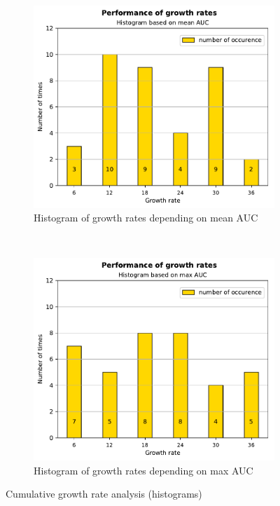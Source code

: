 \begin{figure}
  \centering
  \begin{subfigure}[b]{0.4\textwidth}
    \includegraphics[width=\textwidth]{images/densenet/siamese/densenet_siamese_gr_mean_bar}
    \caption{Histogram of growth rates depending on mean AUC}
    \label{fig:mean_auc_histogram}
  \end{subfigure}
  ~ %
  \begin{subfigure}[b]{0.4\textwidth}
    \includegraphics[width=\textwidth]{images/densenet/siamese/densenet_siamese_gr_max_bar}
    \caption{Histogram of growth rates depending on max AUC}
    \label{fig:max_auc_histogram}
  \end{subfigure}  
  \caption[Cumulative growth rate analysis (histograms)]{Cumulative growth rate analysis (histograms) }
  \label{fig:growthrate_histogram}
\end{figure}

